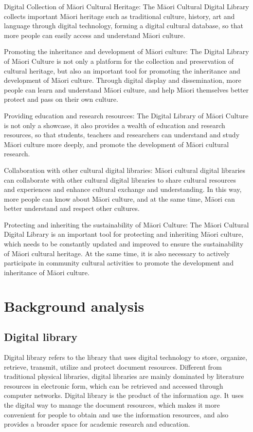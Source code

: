 Digital Collection of Māori Cultural Heritage: The Māori Cultural Digital Library collects important Māori heritage such as traditional culture, history, art and language through digital technology, forming a digital cultural database, so that more people can easily access and understand Māori culture.

Promoting the inheritance and development of Māori culture: The Digital Library of Māori Culture is not only a platform for the collection and preservation of cultural heritage, but also an important tool for promoting the inheritance and development of Māori culture. Through digital display and dissemination, more people can learn and understand Māori culture, and help Māori themselves better protect and pass on their own culture.

Providing education and research resources: The Digital Library of Māori Culture is not only a showcase, it also provides a wealth of education and research resources, so that students, teachers and researchers can understand and study Māori culture more deeply, and promote the development of Māori cultural research.

Collaboration with other cultural digital libraries: Māori cultural digital libraries can collaborate with other cultural digital libraries to share cultural resources and experiences and enhance cultural exchange and understanding. In this way, more people can know about Māori culture, and at the same time, Māori can better understand and respect other cultures.

Protecting and inheriting the sustainability of Māori Culture: The Māori Cultural Digital Library is an important tool for protecting and inheriting Māori culture, which needs to be constantly updated and improved to ensure the sustainability of Māori cultural heritage. At the same time, it is also necessary to actively participate in community cultural activities to promote the development and inheritance of Māori culture.
 
\section{Background analysis}
\subsection{Digital library}
Digital library refers to the library that uses digital technology to store, organize, retrieve, transmit, utilize and protect document resources. Different from traditional physical libraries, digital libraries are mainly dominated by literature resources in electronic form, which can be retrieved and accessed through computer networks. Digital library is the product of the information age. It uses the digital way to manage the document resources, which makes it more convenient for people to obtain and use the information resources, and also provides a broader space for academic research and education.

